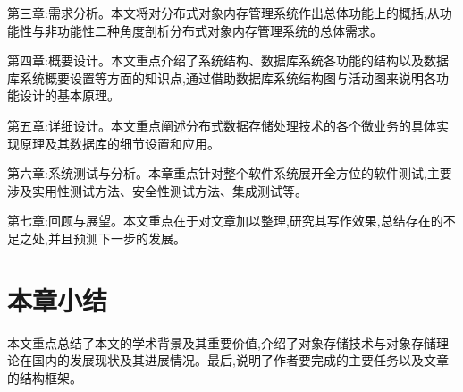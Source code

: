 第三章:需求分析。本文将对分布式对象内存管理系统作出总体功能上的概括,从功能性与非功能性二种角度剖析分布式对象内存管理系统的总体需求。

第四章:概要设计。本文重点介绍了系统结构、数据库系统各功能的结构以及数据库系统概要设置等方面的知识点,通过借助数据库系统结构图与活动图来说明各功能设计的基本原理。

第五章:详细设计。本文重点阐述分布式数据存储处理技术的各个微业务的具体实现原理及其数据库的细节设置和应用。

第六章:系统测试与分析。本章重点针对整个软件系统展开全方位的软件测试,主要涉及实用性测试方法、安全性测试方法、集成测试等。

第七章:回顾与展望。本文重点在于对文章加以整理,研究其写作效果,总结存在的不足之处,并且预测下一步的发展。

\section{本章小结}
本文重点总结了本文的学术背景及其重要价值,介绍了对象存储技术与对象存储理论在国内的发展现状及其进展情况。最后,说明了作者要完成的主要任务以及文章的结构框架。